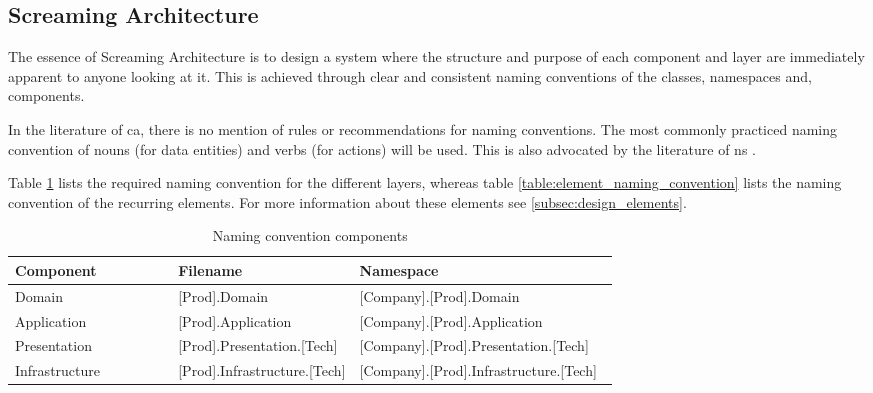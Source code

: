 \subsection{Screaming Architecture}
The essence of Screaming Architecture is to design a system where the structure and
purpose of each component and layer are immediately apparent to anyone looking at it. This
is achieved through clear and consistent naming conventions of the classes, namespaces and,
components.

In the literature of \gls{ca}, there is no mention of rules or recommendations for naming
conventions. The most commonly practiced naming convention of nouns (for data entities)
and verbs (for actions) will be used. This is also advocated by the literature of \gls{ns}
\parencite[357]{mannaert_normalized_2016}.

Table \ref{table:component_naming_convention} lists the required naming convention for the
different layers, whereas table \ref{table:element_naming_convention} lists the naming
convention of the recurring elements. For more information about these elements see
\ref{subsec:design_elements}.

\begin{table}[h]
    \small
    \begin{tabular}{ l p{0.30\linewidth} p{0.43\linewidth} }
    \hline
    \textbf{Component} & \textbf{Filename} & \textbf{Namespace} \\ 
    \hline
    Domain & [Prod].Domain & [Company].[Prod].Domain \\
    Application & [Prod].Application & [Company].[Prod].Application \\
    Presentation & [Prod].Presentation.[Tech] & [Company].[Prod].Presentation.[Tech] \\
    Infrastructure & [Prod].Infrastructure.[Tech] & [Company].[Prod].Infrastructure.[Tech]
    \\ \hline
    \end{tabular}
\caption{Naming convention components}
\label{table:component_naming_convention}
\end{table}

